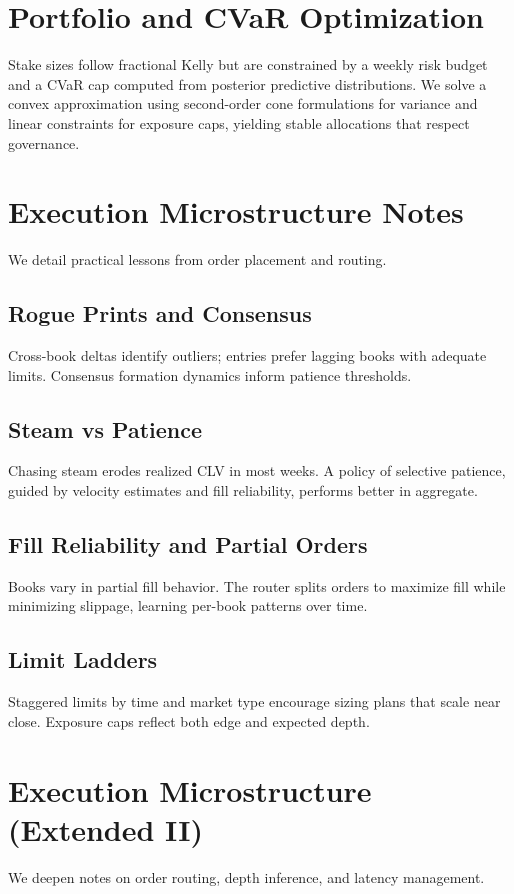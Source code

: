 \section{Portfolio and CVaR Optimization}\label{app:portfolio}
Stake sizes follow fractional Kelly but are constrained by a weekly risk budget and a CVaR cap computed from posterior predictive distributions. We solve a convex approximation using second-order cone formulations for variance and linear constraints for exposure caps, yielding stable allocations that respect governance.

\section{Execution Microstructure Notes}\label{app:exec-micro}
We detail practical lessons from order placement and routing.

\subsection{Rogue Prints and Consensus}
Cross-book deltas identify outliers; entries prefer lagging books with adequate limits. Consensus formation dynamics inform patience thresholds.

\subsection{Steam vs Patience}
Chasing steam erodes realized CLV in most weeks. A policy of selective patience, guided by velocity estimates and fill reliability, performs better in aggregate.

\subsection{Fill Reliability and Partial Orders}
Books vary in partial fill behavior. The router splits orders to maximize fill while minimizing slippage, learning per-book patterns over time.

\subsection{Limit Ladders}
Staggered limits by time and market type encourage sizing plans that scale near close. Exposure caps reflect both edge and expected depth.

\section{Execution Microstructure (Extended II)}\label{app:exec-micro-ext}
We deepen notes on order routing, depth inference, and latency management.

